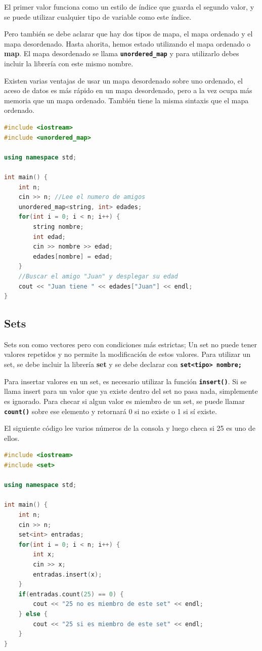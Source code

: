 \documentclass{article}
\begin{document}
El primer valor funciona como un estilo de índice que guarda el segundo valor, y se puede utilizar cualquier tipo de variable como este índice.

Pero también se debe aclarar que hay dos tipos de mapa, el mapa ordenado y el mapa desordenado. Hasta ahorita, hemos estado utilizando el mapa ordenado o \textbf{map}. El mapa desordenado se llama \textbf{\lstinline{unordered_map}} y para utilizarlo debes incluir la librería con este mismo nombre.

Existen varias ventajas de usar un mapa desordenado sobre uno ordenado, el aceso de datos es más rápido en un mapa desordenado, pero a la vez ocupa más memoria que un mapa ordenado. También tiene la misma sintaxis que el mapa ordenado.

\begin{lstlisting}[language=C++, title=Mapa desordenado]
#include <iostream>
#include <unordered_map>

using namespace std;

int main() {
	int n;
	cin >> n; //Lee el numero de amigos
	unordered_map<string, int> edades;
	for(int i = 0; i < n; i++) {
		string nombre;
		int edad;
		cin >> nombre >> edad;
		edades[nombre] = edad;
	}
	//Buscar el amigo "Juan" y desplegar su edad
	cout << "Juan tiene " << edades["Juan"] << endl;
}
\end{lstlisting}

\subsection{Sets}

Sets son como vectores pero con condiciones más estrictas; Un set no puede tener valores repetidos y no permite la modificación de estos valores. Para utilizar un set, se debe incluir la librería \textbf{set} y se debe declarar con \textbf{\lstinline{set<tipo> nombre;}}

Para insertar valores en un set, es necesario utilizar la función \textbf{\lstinline{insert()}}. Si se llama insert para un valor que ya existe dentro del set no pasa nada, simplemente es ignorado. Para checar si algun valor es miembro de un set, se puede llamar \textbf{\lstinline{count()}} sobre ese elemento y retornará 0 si no existe o 1 si sí existe.

El siguiente código lee varios números de la consola y luego checa si 25 es uno de ellos.

\begin{lstlisting}[language=C++, title=Sets]
#include <iostream>
#include <set>

using namespace std;

int main() {
	int n;
	cin >> n;
	set<int> entradas;
	for(int i = 0; i < n; i++) {
		int x;
		cin >> x;
		entradas.insert(x);
	}
	if(entradas.count(25) == 0) {
		cout << "25 no es miembro de este set" << endl;
	} else {
		cout << "25 si es miembro de este set" << endl;
	}
}
\end{lstlisting}
\end{document}
